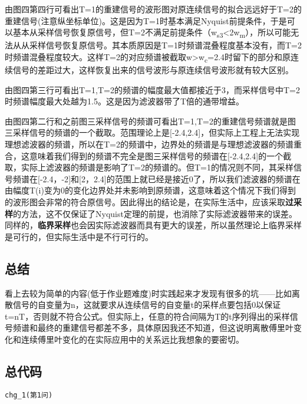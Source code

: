 \documentclass[]{article}
\begin{document}
由图四第四行可看出T=1的重建信号的波形图对原连续信号的拟合远远好于T=2的重建信号(注意纵坐标单位)。这是因为T=1时基本满足Nyquist前提条件，于是可以基本从采样信号恢复原信号，但T=2不满足前提条件（w\textsubscript{s3}\textless{}2w\textsubscript{m}），所以可能无法从从采样信号恢复原信号。其本质原因是T=1时频谱混叠程度基本没有，而T=2时频谱混叠程度较大。这样T=2的对应频谱被截取\textbar{}w\textbar{}\textgreater{}w\textsubscript{c}=2.4时留下的部分和原连续信号的差距过大，这样恢复出来的信号波形与原连续信号波形就有较大区别。

由图四第三行可看出T=1,T=2的频谱的幅度最大值都接近于3，而采样信号中T=2时频谱幅度最大处越为1.5。这是因为滤波器带了T倍的通带增益。

由图四第二行和之前图三采样信号的频谱可看出T=1,T=2的重建信号频谱就是图三采样信号的频谱的一个截取。范围理论上是{[}-2.4,2.4{]}，但实际上工程上无法实现理想滤波器的频谱，所以在T=2的频谱中，边界处的频谱是与理想滤波器的频谱重合，这意味着我们得到的频谱不完全是图三采样信号的频谱在{[}-2.4,2.4{]}的一个截取，实际上滤波器的频谱是影响了T=2的频谱的。但T=1的情况则不同，其采样信号频谱在{[}-2.4，-2{]}和{[}2，2.4{]}的范围上就已经是接近0了，所以我们滤波器的频谱在由幅度T(i)变为0的变化边界处并未影响到原频谱，这意味着这个情况下我们得到的波形图会非常的符合原信号。因此得出的结论是，在实际生活中，应该采取\textbf{过采样}的方法，这不仅保证了Nyquist定理的前提，也消除了实际滤波器带来的误差。同样的，\textbf{临界采样}也会因实际滤波器而具有更大的误差，所以虽然理论上临界采样是可行的，但实际生活中是不行可行的。

\hypertarget{header-n99}{%
\subsection{总结}\label{header-n99}}

看上去较为简单的内容(低于作业题难度)时实践起来才发现有很多的坑------比如离散信号的自变量为n，这就要求从连续信号的自变量t的采样点要包括0以保证t=nT，否则就不符合公式。但实际上，任意的符合间隔为T的t序列得出的采样信号频谱和最终的重建信号都差不多，具体原因我还不知道，但这说明离散傅里叶变化和连续傅里叶变化的在实际应用中的关系远比我想象的要密切。

\hypertarget{header-n102}{%
\subsection{总代码}\label{header-n102}}

\texttt{chg\_1(第1问)}
\end{document}
